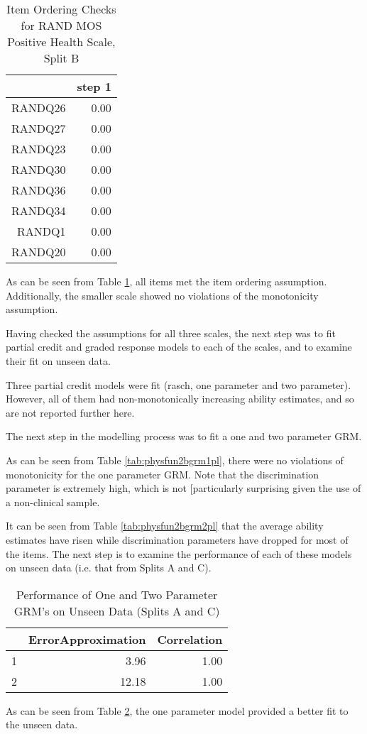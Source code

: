 \documentclass{article}
\begin{document}
\begin{table}[ht]
\centering
\begin{tabular}{rr}
  \hline
 & step 1 \\ 
  \hline
RANDQ26 & 0.00 \\ 
  RANDQ27 & 0.00 \\ 
  RANDQ23 & 0.00 \\ 
  RANDQ30 & 0.00 \\ 
  RANDQ36 & 0.00 \\ 
  RANDQ34 & 0.00 \\ 
  RANDQ1 & 0.00 \\ 
  RANDQ20 & 0.00 \\ 
   \hline
\end{tabular}
\caption{Item Ordering Checks for RAND MOS Positive Health Scale, Split B} 
\label{tab:rand2bposhealthitemord}
\end{table}As can be seen from Table \ref{tab:rand2bposhealthitemord}, all items met the item ordering assumption. 
Additionally, the smaller scale showed no violations of the monotonicity assumption. 



Having checked the assumptions for all three scales, the next step was to fit partial credit and graded response models to each of the scales, and to examine their fit on unseen data. 



Three partial credit models were fit (rasch, one parameter and two parameter). However, all of them had non-monotonically increasing ability estimates, and so are not reported further here. 

The next step in the modelling process was to fit a one and two parameter GRM. 



As can be seen from Table \ref{tab:physfun2bgrm1pl}, there were no violations of monotonicity for the one parameter GRM. Note that the discrimination parameter is extremely high, which is not [particularly surprising given the use of a non-clinical sample. 


It can be seen from Table \ref{tab:physfun2bgrm2pl} that the average ability estimates have risen while discrimination parameters have dropped for most of the items. The next step is to examine the performance of each of these models on unseen data (i.e. that from Splits A and C). 

\begin{table}[ht]
\centering
\begin{tabular}{rrr}
  \hline
 & ErrorApproximation & Correlation \\ 
  \hline
1 & 3.96 & 1.00 \\ 
  2 & 12.18 & 1.00 \\ 
   \hline
\end{tabular}
\caption{Performance of One and Two Parameter GRM's on Unseen Data (Splits A and C)} 
\label{tab:physfun2btest}
\end{table}
As can be seen from Table \ref{tab:physfun2btest}, the one parameter model provided a better fit to the unseen data. 
\end{document}
